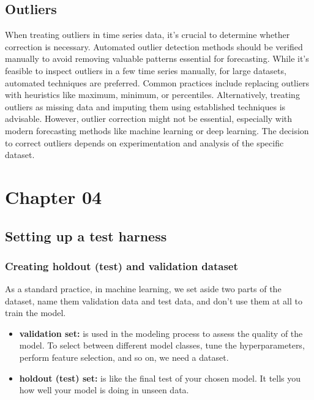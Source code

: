 \documentclass{article}
\begin{document}
\subsection{Outliers}
When treating outliers in time series data, it's crucial to determine whether correction is necessary. Automated outlier detection methods should be verified manually to avoid removing valuable patterns essential for forecasting. While it's feasible to inspect outliers in a few time series manually, for large datasets, automated techniques are preferred. Common practices include replacing outliers with heuristics like maximum, minimum, or percentiles. Alternatively, treating outliers as missing data and imputing them using established techniques is advisable. However, outlier correction might not be essential, especially with modern forecasting methods like machine learning or deep learning. The decision to correct outliers depends on experimentation and analysis of the specific dataset.

\section{Chapter 04}

\subsection{Setting up a test harness}

\subsubsection{Creating holdout (test) and validation dataset}

As a standard practice, in machine learning, we set aside two parts of the dataset, name them validation
data and test data, and don’t use them at all to train the model.

\begin{itemize}

    \item \textbf{validation set:} is used in the
    modeling process to assess the quality of the model. To select between different model classes, tune
    the hyperparameters, perform feature selection, and so on, we need a dataset.
    \item \textbf{holdout (test) set:} is like the final
    test of your chosen model. It tells you how well your model is doing in unseen data.

\end{itemize}
\end{document}
